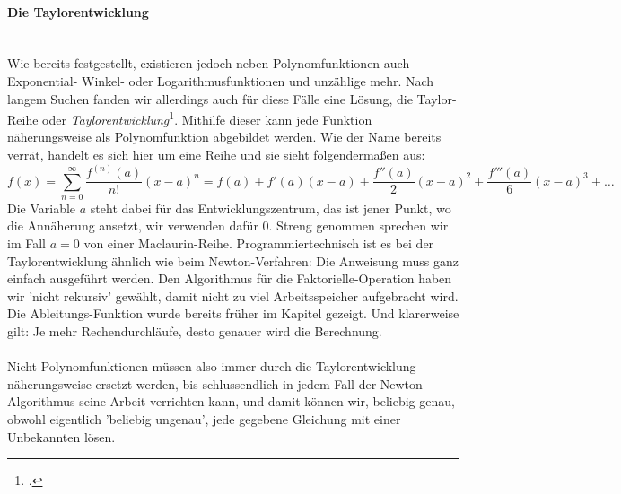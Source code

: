 \paragraph{Die Taylorentwicklung}\ \\
Wie bereits festgestellt, existieren jedoch neben Polynomfunktionen auch  Exponential- Winkel- oder Logarithmusfunktionen und unzählige mehr. Nach langem Suchen fanden wir allerdings auch für diese Fälle eine Lösung, die Taylor-Reihe oder \textit{Taylorentwicklung}\footcite{math_taylor_entwicklung}. Mithilfe dieser kann jede Funktion näherungsweise als Polynomfunktion abgebildet werden. Wie der Name bereits verrät, handelt es sich hier um eine Reihe und sie sieht folgendermaßen aus:
\[f(x)=\sum _{n=0}^{\infty }{\frac {f^{(n)}(a)}{n!}}(x-a)^{n}=f(a)+f'(a)(x-a)+{\frac {f''(a)}{2}}(x-a)^{2}+{\frac {f'''(a)}{6}}(x-a)^{3}+\ldots\]
\noindent
Die Variable $a$ steht dabei für das Entwicklungszentrum, das ist jener Punkt, wo die Annäherung ansetzt, wir verwenden dafür $0$. Streng genommen sprechen wir im Fall $a=0$ von einer Maclaurin-Reihe. Programmiertechnisch ist es bei der Taylorentwicklung ähnlich wie beim Newton-Verfahren: Die Anweisung muss ganz einfach ausgeführt werden. Den Algorithmus für die Faktorielle-Operation haben wir 'nicht rekursiv' gewählt, damit nicht zu viel Arbeitsspeicher aufgebracht wird. Die Ableitungs-Funktion wurde bereits früher im Kapitel gezeigt. Und klarerweise gilt: Je mehr Rechendurchläufe, desto genauer wird die Berechnung.\\
\\
Nicht-Polynomfunktionen müssen also immer durch die Taylorentwicklung näherungsweise ersetzt werden, bis schlussendlich in jedem Fall der Newton-Algorithmus seine Arbeit verrichten kann, und damit können wir, beliebig genau, obwohl eigentlich 'beliebig ungenau', jede gegebene Gleichung mit einer Unbekannten lösen.
